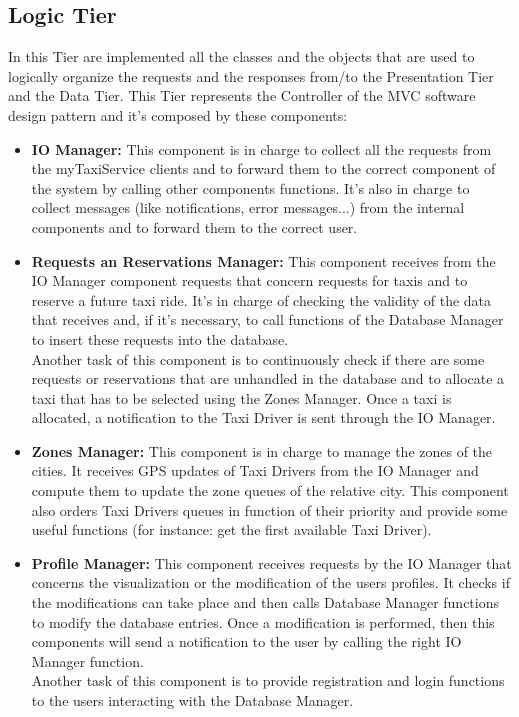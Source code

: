 \documentclass[../../../../../../dd.tex]{subfiles}
\begin{document}
	\subsection{Logic Tier}
		In this Tier are implemented all the classes and the objects that are used to logically organize the requests and the responses from/to the Presentation Tier and the Data Tier.
		This Tier represents the Controller of the MVC software design pattern and it's composed by these components:

		\begin{itemize}
			\item \textbf{IO Manager:} This component is in charge to collect all the requests from the myTaxiService clients and to forward them to the correct component of the system by calling other components functions. It's also in charge to collect messages (like notifications, error messages...) from the internal components and to forward them to the correct user.

			\item \textbf{Requests an Reservations Manager:} This component receives from the IO Manager component requests that concern requests for taxis and to reserve a future taxi ride. It's in charge of checking the validity of the data that receives and, if it's necessary, to call functions of the Database Manager to insert these requests into the database.
			\\
			Another task of this component is to continuously check if there are some requests or reservations that are unhandled in the database and to allocate a taxi that has to be selected using the Zones Manager. Once a taxi is allocated, a notification to the Taxi Driver is sent through the IO Manager.

			\item \textbf{Zones Manager:} This component is in charge to manage the zones of the cities. It receives GPS updates of Taxi Drivers from the IO Manager and compute them to update the zone queues of the relative city. This component also orders Taxi Drivers queues in function of their priority and provide some useful functions (for instance: get the first available Taxi Driver).

			\item \textbf{Profile Manager:} This component receives requests by the IO Manager that concerns the visualization or the modification of the users profiles. It checks if the modifications can take place and then calls Database Manager functions to modify the database entries. Once a modification is performed, then this components will send a notification to the user by calling the right IO Manager function.
			\\
			Another task of this component is to provide registration and login functions to the users interacting with the Database Manager.
			
		\end{itemize}
	
\end{document}
